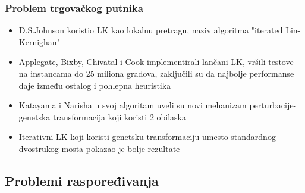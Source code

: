 \documentclass{beamer}
\begin{document}
\begin{frame}[fragile]\frametitle{Problem trgovačkog putnika}
\begin{itemize}
  \item  D.S.Johnson koristio LK kao lokalnu pretragu, naziv algoritma "iterated Lin-Kernighan" 
  \item Applegate, Bixby, Chivatal i Cook implementirali lančani LK, vršili testove na instancama do 25 miliona gradova, zaključili su da najbolje performanse daje između ostalog i pohlepna heuristika
  \item Katayama i Narisha u svoj algoritam uveli su novi mehanizam perturbacije-genetska transformacija koji koristi 2 obilaska
  \item Iterativni LK koji koristi genetsku transformaciju umesto standardnog dvostrukog mosta pokazao je bolje rezultate
\end{itemize}
\end{frame}

\subsection{Problemi raspoređivanja}
\end{document}
